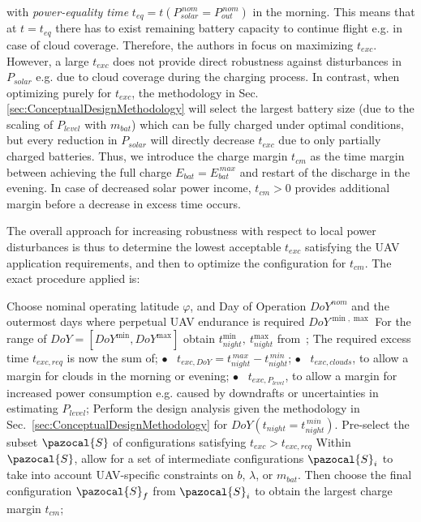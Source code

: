 with \textit{power-equality time} $t_{eq}=t(P_{solar}^{\,nom}=P_{out}^{\,nom})$ in the morning. This means that at $t=t_{eq}$ there has to exist remaining battery capacity to continue flight e.g. in case of cloud coverage. Therefore, the authors in \cite{Noth_PhD,Leutenegger_JIRS} focus on maximizing $t_{exc}$. However, a large $t_{exc}$ does not provide direct robustness against disturbances in $P_{solar}$ e.g. due to cloud coverage during the charging process. In contrast, when optimizing purely for $t_{exc}$, the methodology in Sec. \ref{sec:ConceptualDesignMethodology} will select the largest battery size (due to the scaling of $P_{level}$ with $m_{bat}$) which can be fully charged under optimal conditions, but every reduction in $P_{solar}$ will directly decrease $t_{exc}$ due to only partially charged batteries. Thus, we introduce the charge margin $t_{cm}$ as the time margin between achieving the full charge $E_{bat}=E_{bat}^{\,max}$ and restart of the discharge in the evening. In case of decreased solar power income, $t_{cm}>0$ provides additional margin before a decrease in excess time occurs.

The overall approach for increasing robustness with respect to local power disturbances is thus to determine the lowest acceptable $t_{exc}$ satisfying the UAV application requirements, and then to optimize the configuration for $t_{cm}$. The exact procedure applied is:
\vspace{-3ex}
\begin{algorithm}[htp]
  \SetAlgoLined\DontPrintSemicolon
  \myproc{} %
  {
  \nl Choose nominal operating latitude $\varphi$, and Day of Operation $DoY^{nom}$ and the outermost days where perpetual UAV endurance is required $DoY^{\min,\max}$ \;
  \nl For the range of $DoY=[DoY^{\min},DoY^{\max}]$ obtain $t_{night}^{\min},~t_{night}^{\max}$ from~\cite{Duffie_SolarEngineering}; \;
  \nl The required excess time $t_{exc,req}$ is now the sum of;  \; 
  \pushline
  \nonl \scriptsize$\bullet$\normalsize~  $t_{exc,DoY} = t_{night}^{\,max}-t_{night}^{\,min}$; \;
  \nonl \scriptsize$\bullet$\normalsize~  $t_{exc,clouds}$, to allow a margin for clouds in the morning or evening; \;
  \nonl \scriptsize$\bullet$\normalsize~  $t_{exc,P_{level}}$, to allow a margin for increased power consumption e.g. caused by downdrafts or uncertainties in estimating $P_{level}$; \;
  \popline \nl 
  \nl Perform the design analysis given the methodology in Sec.~\ref{sec:ConceptualDesignMethodology} for $DoY(t_{night}=t_{night}^{\,min})$. Pre-select the subset $\pazocal{S}$ of configurations satisfying $t_{exc}>t_{exc,req}$  \;
  \nl Within $\pazocal{S}$, allow for a set of intermediate configurations $\pazocal{S}_i$ to take into account UAV-specific constraints on $b$, $\lambda$, or $m_{bat}$. Then choose the final configuration $\pazocal{S}_f$  from $\pazocal{S}_i$ to obtain the largest charge margin $t_{cm}$; %
 }
\end{algorithm}

